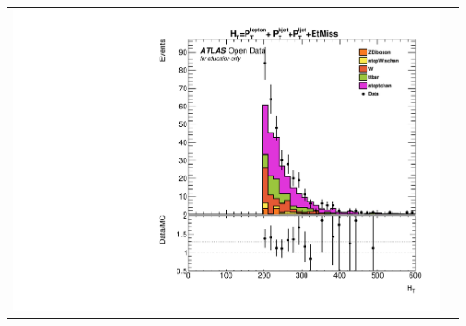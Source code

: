 \documentclass[10pt]{beamer}
\begin{document}
\begin{frame}
\begin{center}
\begin{tabular}{cc}
		
		\includegraphics[scale=0.22]{Ht_cuts} 
		
		
		
	\end{tabular}
\end{center}
\end{frame}
\end{document}
